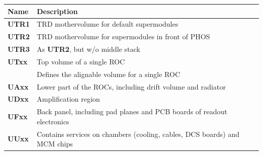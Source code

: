 \documentclass{alicetdr}
\begin{document}
%
\begin{center}
\begin{tabular}{l|l}
Name       & Description                                                                \\ \hline
{\bf UTR1} & TRD mothervolume for default supermodules                                  \\
{\bf UTR2} & TRD mothervolume for supermodules in front of PHOS                         \\
{\bf UTR3} & As {\bf UTR2}, but w/o middle stack                                        \\ \hline
{\bf UTxx} & Top volume of a single ROC                                                 \\ 
           & Defines the alignable volume for a single ROC                              \\ \hline
{\bf UAxx} & Lower part of the ROCs, including drift volume and radiator                \\
{\bf UDxx} & Amplification region                                                       \\
{\bf UFxx} & Back panel, including pad planes and PCB boards of readout electronics     \\
{\bf UUxx} & Contains services on chambers (cooling, cables, DCS boards) and MCM chips  \\
\end{tabular}
\end{center}
%
\end{document}

